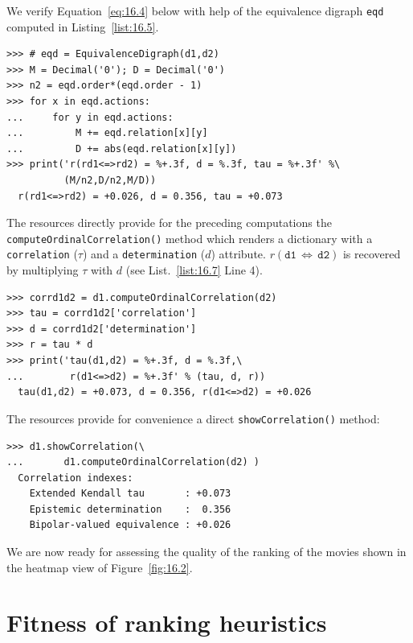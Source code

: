 We verify Equation~\vref{eq:16.4} below with help of the equivalence digraph \texttt{eqd} computed in Listing~\vref{list:16.5}.
\begin{lstlisting}[caption={Computing the ordinal correlation index from the equivalence digraph},label=list:16.6]
>>> # eqd = EquivalenceDigraph(d1,d2)
>>> M = Decimal('0'); D = Decimal('0')
>>> n2 = eqd.order*(eqd.order - 1)
>>> for x in eqd.actions:
...     for y in eqd.actions:
...         M += eqd.relation[x][y]
...         D += abs(eqd.relation[x][y])
>>> print('r(rd1<=>rd2) = %+.3f, d = %.3f, tau = %+.3f' %\
          (M/n2,D/n2,M/D))   
  r(rd1<=>rd2) = +0.026, d = 0.356, tau = +0.073  
\end{lstlisting}

The \Digraph resources directly provide for the preceding computations the \texttt{compute\-OrdinalCorrelation()} method which renders a dictionary with a \texttt{correlation} ($\tau$) and a \texttt{determina\-tion} ($d$) attribute. $r(\mathtt{d1}\,\Leftrightarrow\, \mathtt{d2})$ is recovered by multiplying $\tau$ with $d$ (see List.~\vref{list:16.7} Line 4). 
\begin{lstlisting}[caption={Computing the valued ordinal correlation index},label=list:16.7]
>>> corrd1d2 = d1.computeOrdinalCorrelation(d2)
>>> tau = corrd1d2['correlation']
>>> d = corrd1d2['determination']
>>> r = tau * d
>>> print('tau(d1,d2) = %+.3f, d = %.3f,\
...        r(d1<=>d2) = %+.3f' % (tau, d, r))
  tau(d1,d2) = +0.073, d = 0.356, r(d1<=>d2) = +0.026
\end{lstlisting}

The \Digraph resources provide for convenience a direct \texttt{showCorrela\-tion()} method:
\begin{lstlisting}
>>> d1.showCorrelation(\
...       d1.computeOrdinalCorrelation(d2) )
  Correlation indexes:
    Extended Kendall tau       : +0.073
    Epistemic determination    :  0.356
    Bipolar-valued equivalence : +0.026
\end{lstlisting}

We are now ready for assessing the quality of the \NetFlows ranking of the movies shown in the heatmap view of Figure~\vref{fig:16.2}. 

\section{Fitness of ranking heuristics}
\label{sec:16.4}

